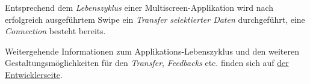 {Entsprechend dem \textit{Lebenszyklus} einer Multiscreen-Applikation wird nach erfolgreich ausgeführtem Swipe ein \textit{Transfer} \textit{selektierter Daten} durchgeführt, eine \textit{Connection} besteht bereits.

Weitergehende Informationen zum Applikations-Lebenszyklus und den weiteren Gestaltungsmöglichkeiten für den \textit{Transfer}, \textit{Feedbacks} etc. finden sich auf \href{http://141.19.142.50/sysplace/}{der Entwicklerseite}.
}


\newcommand{\authors}{
Alexander Hahn, Hochschule Mannheim  \\
Valentina Burjan, Hochschule Mannheim \\
Dominick Madden, Hochschule Mannheim \\
Horst Schneider, Hochschule Mannheim}

\newcommand{\versionhistory}{12.05.2016}
\newcommand{\dateofcreation}{17.09.2015}
\newcommand{\comments}{---}
\newcommand{\questions}{---}



